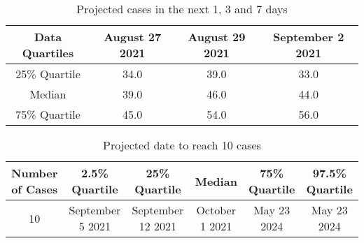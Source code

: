 
\begin{table}[h] 
 \centering 
 \begin{tabular}{c|c|c|c}
Data Quartiles & August 27 2021 & August 29 2021 & September 2 2021\\
\hline
25\% Quartile & 34.0 & 39.0 & 33.0\\
Median & 39.0 & 46.0 & 44.0\\
75\% Quartile & 45.0 & 54.0 & 56.0\\
\end{tabular}
\caption{Projected cases in the next 1, 3 and 7 days}
\label{tab:BP_predicted_cases}
\end{table}

\begin{table}[h] 
 \centering 
 \begin{tabular}{c|c|c|c|c|c}
Number of Cases & 2.5\% Quartile & 25\% Quartile & Median & 75\% Quartile & 97.5\% Quartile \\
\hline
10 & September 5 2021 & September 12 2021 & October 1 2021 & May 23 2024 & May 23 2024\\
\end{tabular}
\caption{Projected date to reach 10 cases}
\label{tab:BP_date_to_reach_cases}
\end{table}
